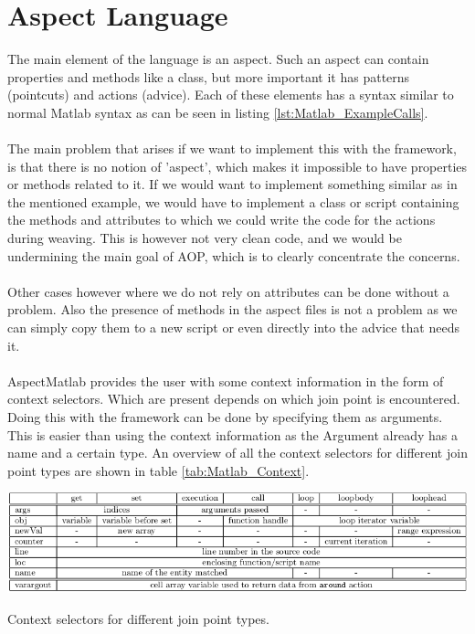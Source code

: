\documentclass[a4paper]{report}
\begin{document}
\section{Aspect Language}
The main element of the language is an aspect. Such an aspect can contain properties and methods like a class, but more important it has patterns (pointcuts) and actions (advice). Each of these elements has a syntax similar to normal Matlab syntax as can be seen in listing \ref{lst:Matlab_ExampleCalls}.\\
\\
The main problem that arises if we want to implement this with the framework, is that there is no notion of 'aspect', which makes it impossible to have properties or methods related to it. If we would want to implement something similar as in the mentioned example, we would have to implement a class or script containing the methods and attributes to which we could write the code for the actions during weaving. This is however not very clean code, and we would be undermining the main goal of AOP, which is to clearly concentrate the concerns.\\
\\
Other cases however where we do not rely on attributes can be done without a problem. Also the presence of methods in the aspect files is not a problem as we can simply copy them to a new script or even directly into the advice that needs it.\\
\\
AspectMatlab provides the user with some context information in the form of context selectors. Which are present depends on which join point is encountered. Doing this with the framework can be done by specifying them as arguments. This is easier than using the context information as the Argument already has a name and a certain type. An overview of all the context selectors for different join point types are shown in table \ref{tab:Matlab_Context}.
\begin{table}[h!]
\includegraphics[width=\textwidth]{images/Languages/Matlab_Context.png}
\caption{Context selectors for different join point types.\citep{aslam_aspectmatlab:_2010}}
\label{tab:Matlab_Context}
\end{table}
\end{document}
